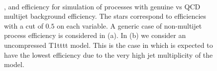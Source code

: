 \begin{figure}[!h]
 \centering
 ~
  \\
 \caption{\bdphi, \dphimhtj and \dphimhtjall efficiency for simulation of processes with genuine
 \met vs QCD multijet background efficiency. The stars correspond to
 efficiencies with a cut of $0.5$ on each variable. A generic case of
 non-multijet process efficiency is considered in (a). In (b) we
 consider an uncompressed T1tttt model. This is the case in which \bdphi is
 expected to have the lowest efficiency due to the very high jet
 multiplicity of the model.}
 \label{fig:bDPhi_roc}
\end{figure}

